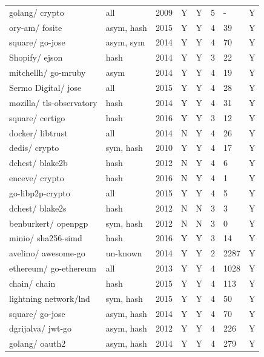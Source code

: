 \documentclass[
  digital, %
  notable,   %
  lof,     %
  lot,     %
]{fithesis3}
\begin{document}
\begin{center}
\begin{longtable}[th]{|P{1.6cm}|Q{1cm}P{1cm}Q{1cm}P{1.3cm}Q{1.3cm}P{1.2cm}Q{1.1cm}|}
golang/ crypto & all & 2009 & Y & Y & 5 & - & Y\\ [3ex]
ory-am/ fosite & asym, hash & 2015 & Y & Y & 4 & 39 & Y \\ [4ex]
square/ go-jose & asym, sym & 2014 & Y & Y & 4 & 70 & Y \\ [4ex]
Shopify/ ejson & hash & 2014 & Y & Y & 3 & 22 & Y \\ [3ex]
mitchellh/ go-mruby & asym & 2014 & Y & Y & 4 & 19 & Y \\ [4ex]
Sermo Digital/ jose & all & 2015 & Y & Y & 4 & 28 & Y \\ [4ex]
mozilla/ tls-observatory & hash & 2014 & Y & Y & 4 & 31 & Y \\ [4ex]
square/ certigo & hash & 2016 & Y & Y & 3 & 12 & Y \\ [3ex]
docker/ libtrust & all & 2014 & N & Y & 4 & 26 & Y \\ [3ex]
dedis/ crypto & sym, hash & 2010 & Y & Y & 4 & 17 & Y \\ [3ex]
dchest/ blake2b & hash & 2012 & N & Y & 4 & 6 & Y \\ [3ex]
enceve/ crypto & hash & 2016 & N & Y & 4 & 1 & Y \\ [3ex]
go-libp2p-crypto & all & 2015 & Y & Y & 4 & 5 & Y \\ [3ex]
dchest/ blake2s & hash & 2012 & N & N & 3 & 3 & Y \\ [3ex]
benburkert/ openpgp & sym, hash & 2012 & N & N & 3 & 0 & Y \\ [4ex]
minio/ sha256-simd & hash & 2016 & Y & Y & 3 & 14 & Y \\ [4ex]
avelino/ awesome-go & un-known & 2014 & Y & Y & 2 & 2287 & Y \\ [4ex]
ethereum/ go-ethereum & all & 2013 & Y & Y & 4 & 1028 & Y \\ [4ex]
chain/ chain & hash & 2015 & Y & Y & 4 & 113 & Y \\ [3ex]
lightning network/lnd & sym, hash & 2015 & Y & Y & 4 & 50 & Y \\ [4ex]
square/ go-jose & asym, hash & 2014 & Y & Y & 4 & 70 & Y \\ [3ex]
dgrijalva/ jwt-go & asym, hash & 2012 & Y & Y & 4 & 226 & Y \\ [3ex]
golang/ oauth2 & asym, hash & 2014 & Y & Y & 4 & 279 & Y \\ [3ex] 
\end{longtable}
\end{center}
\end{document}
